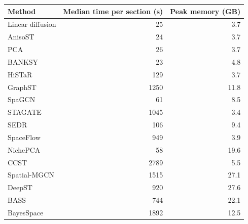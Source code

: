 \begin{tabular}{lrr}
\toprule
Method & Median time per section (s) & Peak memory (GB) \\
\midrule
Linear diffusion & 25 & 3.7 \\
AnisoST & 24 & 3.7 \\
PCA & 26 & 3.7 \\
BANKSY & 23 & 4.8 \\
HiSTaR & 129 & 3.7 \\
GraphST & 1250 & 11.8 \\
SpaGCN & 61 & 8.5 \\
STAGATE & 1045 & 3.4 \\
SEDR & 106 & 9.4 \\
SpaceFlow & 949 & 3.9 \\
NichePCA & 58 & 19.6 \\
CCST & 2789 & 5.5 \\
Spatial-MGCN & 1515 & 27.1 \\
DeepST & 920 & 27.6 \\
BASS & 744 & 22.1 \\
BayesSpace & 1892 & 12.5 \\
\bottomrule
\end{tabular}
